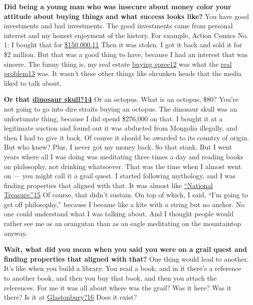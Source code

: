 \textbf{Did being a young man who was insecure about money color your
attitude about buying things and what success looks like?} You have good
investments and bad investments. The good investments came from personal
interest and my honest enjoyment of the history. For example, Action
Comics No. 1: I bought that for
\href{http://nytimes3xbfgragh.onion\#tooltip-11}{\$150,000.}\href{http://nytimes3xbfgragh.onion\#tooltip-11}{11}
Then it was stolen. I got it back and sold it for \$2 million. But that
was a good thing to have, because I had an interest that was sincere.
The funny thing is, my real estate
\href{http://nytimes3xbfgragh.onion\#tooltip-12}{buying spree12} was
what the \href{http://nytimes3xbfgragh.onion\#tooltip-13}{real
problem13} was. It wasn't these other things like shrunken heads that
the media liked to talk about.

\textbf{Or that
\href{http://nytimes3xbfgragh.onion\#tooltip-14}{dinosaur
skull?}\href{http://nytimes3xbfgragh.onion\#tooltip-14}{14}} Or an
octopus. What is an octopus, \$80? You're not going to go into dire
straits buying an octopus. The dinosaur skull was an unfortunate thing,
because I did spend \$276,000 on that. I bought it at a legitimate
auction and found out it was abducted from Mongolia illegally, and then
I had to give it back. Of course it should be awarded to its country of
origin. But who knew? Plus, I never got my money back. So that stank.
But I went years where all I was doing was meditating three times a day
and reading books on philosophy, not drinking whatsoever. That was the
time when I almost went on --- you might call it a grail quest. I
started following mythology, and I was finding properties that aligned
with that. It was almost like
\href{http://nytimes3xbfgragh.onion\#tooltip-15}{``National
Treasure.''}\href{http://nytimes3xbfgragh.onion\#tooltip-15}{15} Of
course, that didn't sustain. On top of which, I said, ``I'm going to get
off philosophy,'' because I became like a kite with a string but no
anchor. No one could understand what I was talking about. And I thought
people would rather see me as an orangutan than as an eagle meditating
on the mountaintop anyway.

\textbf{Wait, what did you mean when you said you were on a grail quest
and finding properties that aligned with that?} One thing would lead to
another. It's like when you build a library. You read a book, and in it
there's a reference to another book, and then you buy that book, and
then you attach the references. For me it was all about where was the
grail? Was it here? Was it there? Is it at
\href{http://nytimes3xbfgragh.onion\#tooltip-16}{Glastonbury?}\href{http://nytimes3xbfgragh.onion\#tooltip-16}{16}
Does it exist?

